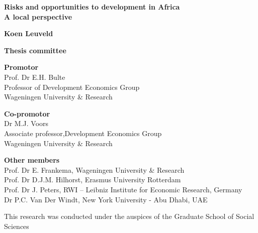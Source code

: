 
\hypersetup{pageanchor=false}
\singlespacing

\begin{titlepage}
   \begin{center}
          \vspace*{1cm}

          \Huge
          \textbf{Risks and opportunities to development in Africa \\ \LARGE A local perspective}


          \vfill
          \large     
          \textbf{Koen Leuveld}
               
          \vspace{0.8cm}
   \end{center}
\end{titlepage}


\begin{titlepage}
   \vspace*{1cm}
   \vspace*{\fill}

   \noindent
   \textbf{Thesis committee}\\
   \vspace*{0.5cm}
   
   \noindent
   \textbf{Promotor} \\
   Prof. Dr E.H. Bulte \\
   Professor of Development Economics Group \\
   Wageningen University \& Research\\
   \vspace*{0.5cm}
   
   \noindent
   \textbf{Co-promotor} \\
   Dr M.J. Voors \\
   Associate professor,Development Economics Group \\
   Wageningen University \& Research\\
   \vspace*{0.5cm}
   
   \noindent
   \textbf{Other members} \\
   Prof. Dr E. Frankema, Wageningen University \& Research\\
   Prof. Dr D.J.M. Hilhorst, Erasmus University Rotterdam\\
   Prof. Dr J. Peters, RWI – Leibniz Institute for Economic Research, Germany\\
   Dr P.C. Van Der Windt, New York University - Abu Dhabi, UAE\\
   \vspace*{0.5cm}
   
   \noindent
   This research was conducted under the auspices of the Graduate School of Social Sciences
   \vspace{0.8cm}
\end{titlepage}



